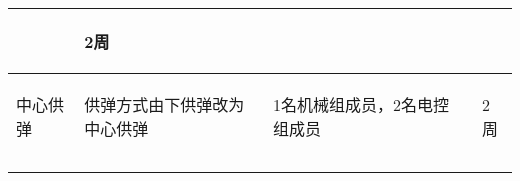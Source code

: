 \begin{longtable}{ p{2cm} | p{3cm} | p{3cm} | p{4.8cm} | p{2cm} |}
\begin{center}
        \end{center} &
        \begin{center}
            2周
        \end{center}\\

    \hline
    
        \begin{center}
            中心供弹
        \end{center} &
        \begin{center}
            供弹方式由下供弹改为中心供弹
        \end{center} &
        \begin{center}
            1名机械组成员，2名电控组成员
        \end{center} &
        \begin{center}
            
        \end{center} &
        \begin{center}
            2周
        \end{center}\\

    \hline
    
        \begin{center}
            
        \end{center} &
        \begin{center}
            
        \end{center} &
        \begin{center}
            
        \end{center} &
        \begin{center}
            
        \end{center} &
        \begin{center}
            
        \end{center} \\
        
    \hline
    
        &
        &
        &
        &
        \\


\end{longtable}
